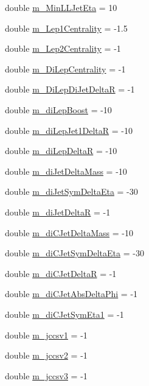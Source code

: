\begin{DoxyCompactItemize}
double \hyperlink{classHttProduct_a306c181da30a859bd7a13a8beadbdde8}{m\_\-MinLLJetEta} = 10
\item 
double \hyperlink{classHttProduct_a8bdd8eb96d0520201f6a22c63825c054}{m\_\-Lep1Centrality} = -\/1.5
\item 
double \hyperlink{classHttProduct_ad25c9324459c0af1d52a48d390ba10f5}{m\_\-Lep2Centrality} = -\/1
\item 
double \hyperlink{classHttProduct_a17019f40da6b7ba83825adeefd969762}{m\_\-DiLepCentrality} = -\/1
\item 
double \hyperlink{classHttProduct_af1162d2a415a6723deb5c030b927d5bb}{m\_\-DiLepDiJetDeltaR} = -\/1
\item 
double \hyperlink{classHttProduct_a3bbd6c168edc7d78fadea31138436d80}{m\_\-diLepBoost} = -\/10
\item 
double \hyperlink{classHttProduct_a19a4c4f7995a7610bc10a51ed67a9745}{m\_\-diLepJet1DeltaR} = -\/10
\item 
double \hyperlink{classHttProduct_ab5ac9c755a375ddcf9c7fa7f98b7ddcf}{m\_\-diLepDeltaR} = -\/10
\item 
double \hyperlink{classHttProduct_a955310c3531e866279424134441817b8}{m\_\-diJetDeltaMass} = -\/10
\item 
double \hyperlink{classHttProduct_a6fce97a5c2d17c85ef4fe7f43da9577a}{m\_\-diJetSymDeltaEta} = -\/30
\item 
double \hyperlink{classHttProduct_a24e5e7cffc173ca220dac9da285f808a}{m\_\-diJetDeltaR} = -\/1
\item 
double \hyperlink{classHttProduct_af3ab7873fcb22271944c6230723c3a2f}{m\_\-diCJetDeltaMass} = -\/10
\item 
double \hyperlink{classHttProduct_a65bad50cdbf271e1feaea726b4df4ea3}{m\_\-diCJetSymDeltaEta} = -\/30
\item 
double \hyperlink{classHttProduct_aa495631422c54973b3565a1113bda0ba}{m\_\-diCJetDeltaR} = -\/1
\item 
double \hyperlink{classHttProduct_ade6a2753273f1bcf7dba3ffbc843e0b0}{m\_\-diCJetAbsDeltaPhi} = -\/1
\item 
double \hyperlink{classHttProduct_a681ffc49f91457b1ff5d8a3a938cc6b6}{m\_\-diCJetSymEta1} = -\/1
\item 
double \hyperlink{classHttProduct_ac6955f8cf5af8bed0cbd98dc28a63e82}{m\_\-jccsv1} = -\/1
\item 
double \hyperlink{classHttProduct_a12e1a3ff84e4a6a2a35a867920ba6e0f}{m\_\-jccsv2} = -\/1
\item 
double \hyperlink{classHttProduct_a5aba8fcf3ac6800253caa48ac9188fa4}{m\_\-jccsv3} = -\/1

\end{DoxyCompactItemize}
